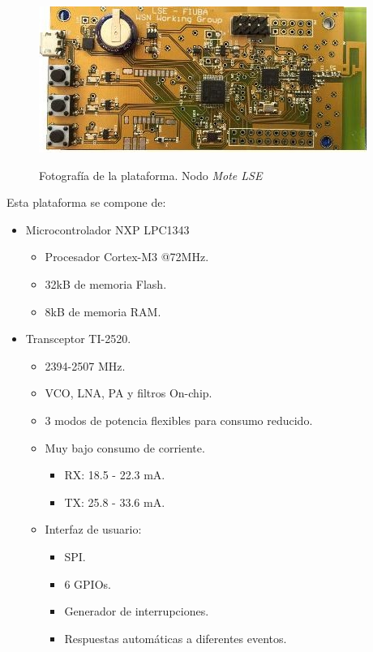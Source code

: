 \begin{figure}[h!]
	\centering
    \includegraphics[width=.8\textwidth]{./Figures/mote.jpg}
	\label{fig:mote}
	\caption{Fotografía de la plataforma. Nodo \textit{Mote LSE}}
\end{figure}

\noindent Esta plataforma se compone de:
\begin{itemize}
\item Microcontrolador NXP LPC1343
   \begin{itemize}
   \item Procesador Cortex-M3 @72MHz. 
   \item 32kB de memoria Flash.
   \item 8kB de memoria RAM.
   \end{itemize}
\item Transceptor TI-2520.
		\begin{itemize}
			\item 2394-2507 MHz.
			\item VCO, LNA, PA y filtros On-chip.
			\item 3 modos de potencia flexibles para consumo reducido.
			\item Muy bajo consumo de corriente.
			\begin{itemize}
				\item RX: 18.5 - 22.3 mA.
				\item TX: 25.8 - 33.6 mA.
			\end{itemize}
			\item Interfaz de usuario:
			\begin{itemize}
				\item SPI.
				\item 6 GPIOs.
 				\item Generador de interrupciones.
				\item Respuestas automáticas a diferentes eventos.
			\end{itemize}
		\end{itemize}

\end{itemize}
